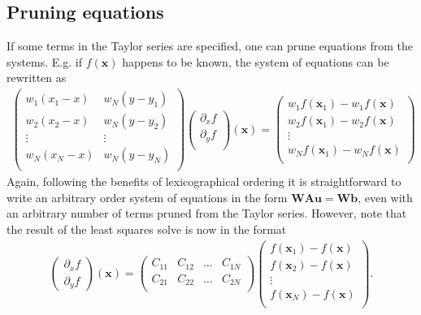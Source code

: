 \documentclass[letterpaper,10pt,english]{sphinxmanual}
\begin{document}
\subsection{Pruning equations}
\label{\detokenize{Utilities/LeastSquares:pruning-equations}}
\sphinxAtStartPar
If some terms in the Taylor series are specified, one can prune equations from the systems.
E.g. if \(f\left(\mathbf{x}\right)\) happens to be known, the system of equations can be rewritten as
\begin{equation*}
\begin{split}\begin{pmatrix}
w_1(x_1 - x) & w_N(y - y_1) \\
w_2(x_2 - x) & w_N(y - y_2) \\
\vdots & \vdots \\
w_N(x_N - x) & w_N(y - y_N) \\
\end{pmatrix}
\begin{pmatrix}
\partial_x f \\
\partial_y f \\
\end{pmatrix}(\mathbf{x})
=
\begin{pmatrix}
w_1f(\mathbf{x}_1) - w_1f(\mathbf{x})  \\
w_2f(\mathbf{x}_1) - w_2f(\mathbf{x})  \\
\vdots \\
w_Nf(\mathbf{x}_1) - w_Nf(\mathbf{x})  \\
\end{pmatrix}\end{split}
\end{equation*}
\sphinxAtStartPar
Again, following the benefits of lexicographical ordering it is straightforward to write an arbitrary order system of equations in the form \(\mathbf{W}\mathbf{A}\mathbf{u} = \mathbf{W}\mathbf{b}\), even with an arbitrary number of terms pruned from the Taylor series.
However, note that the result of the least squares solve is now in the format
\begin{equation*}
\begin{split}\begin{pmatrix}
\partial_x f \\
\partial_y f
\end{pmatrix}(\mathbf{x})
=
\begin{pmatrix}
C_{11} & C_{12} & \ldots & C_{1N} \\
C_{21} & C_{22} & \ldots & C_{2N} \\
\end{pmatrix}
\begin{pmatrix}
f(\mathbf{x}_1) - f(\mathbf{x}) \\
f(\mathbf{x}_2) - f(\mathbf{x}) \\
\vdots \\
f(\mathbf{x}_N) - f(\mathbf{x}) \\
\end{pmatrix}.\end{split}
\end{equation*}
\end{document}
